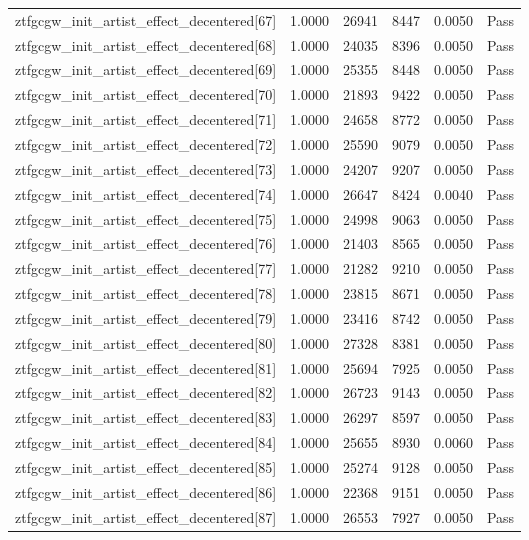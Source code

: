 \begin{table}[htbp]
\begin{tabular}{llrrll}
ztfgcgw\_init\_artist\_effect\_decentered[67] & 1.0000 & 26941 & 8447 & 0.0050 & Pass \\
ztfgcgw\_init\_artist\_effect\_decentered[68] & 1.0000 & 24035 & 8396 & 0.0050 & Pass \\
ztfgcgw\_init\_artist\_effect\_decentered[69] & 1.0000 & 25355 & 8448 & 0.0050 & Pass \\
ztfgcgw\_init\_artist\_effect\_decentered[70] & 1.0000 & 21893 & 9422 & 0.0050 & Pass \\
ztfgcgw\_init\_artist\_effect\_decentered[71] & 1.0000 & 24658 & 8772 & 0.0050 & Pass \\
ztfgcgw\_init\_artist\_effect\_decentered[72] & 1.0000 & 25590 & 9079 & 0.0050 & Pass \\
ztfgcgw\_init\_artist\_effect\_decentered[73] & 1.0000 & 24207 & 9207 & 0.0050 & Pass \\
ztfgcgw\_init\_artist\_effect\_decentered[74] & 1.0000 & 26647 & 8424 & 0.0040 & Pass \\
ztfgcgw\_init\_artist\_effect\_decentered[75] & 1.0000 & 24998 & 9063 & 0.0050 & Pass \\
ztfgcgw\_init\_artist\_effect\_decentered[76] & 1.0000 & 21403 & 8565 & 0.0050 & Pass \\
ztfgcgw\_init\_artist\_effect\_decentered[77] & 1.0000 & 21282 & 9210 & 0.0050 & Pass \\
ztfgcgw\_init\_artist\_effect\_decentered[78] & 1.0000 & 23815 & 8671 & 0.0050 & Pass \\
ztfgcgw\_init\_artist\_effect\_decentered[79] & 1.0000 & 23416 & 8742 & 0.0050 & Pass \\
ztfgcgw\_init\_artist\_effect\_decentered[80] & 1.0000 & 27328 & 8381 & 0.0050 & Pass \\
ztfgcgw\_init\_artist\_effect\_decentered[81] & 1.0000 & 25694 & 7925 & 0.0050 & Pass \\
ztfgcgw\_init\_artist\_effect\_decentered[82] & 1.0000 & 26723 & 9143 & 0.0050 & Pass \\
ztfgcgw\_init\_artist\_effect\_decentered[83] & 1.0000 & 26297 & 8597 & 0.0050 & Pass \\
ztfgcgw\_init\_artist\_effect\_decentered[84] & 1.0000 & 25655 & 8930 & 0.0060 & Pass \\
ztfgcgw\_init\_artist\_effect\_decentered[85] & 1.0000 & 25274 & 9128 & 0.0050 & Pass \\
ztfgcgw\_init\_artist\_effect\_decentered[86] & 1.0000 & 22368 & 9151 & 0.0050 & Pass \\
ztfgcgw\_init\_artist\_effect\_decentered[87] & 1.0000 & 26553 & 7927 & 0.0050 & Pass \\

\end{tabular}
\end{table}
